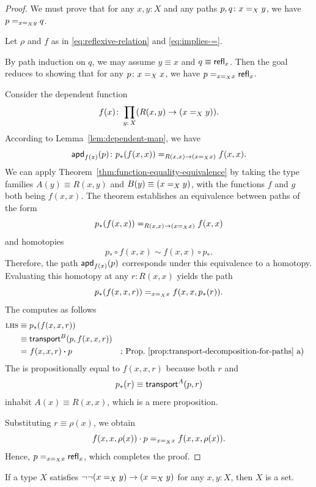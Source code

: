 \begin{proof}
    We must prove that for any $x,y\colon X$ and any paths $p,q\colon x\eq Xy$, we have $p\mathrel{=_{x\mathrel{=_{X}}y}}q$.

    Let $\rho$ and $f$ as in \eqref{eq:reflexive-relation} and \eqref{eq:implies-=}. 
    
    By path induction on $q$, we may assume $y\equiv x$ and $q\equiv\mathsf{refl}_x$. Then the goal reduces to showing that for any $p\colon x\eq Xx$, we have $p\mathrel{=_{x\mathrel{=_{X}}x}}\mathsf{refl}_x$.

    Consider the dependent function
    \[
        f(x)\colon\prod_{y\colon X}(R(x,y)\to(x\eq{X}y)).
    \]
    According to Lemma~\ref{lem:dependent-map}, we have
    \[
        \fun{apd}_{f(x)}(p)\colon
        p_*(f(x,x))\eq{R(x,x)\to(x\eq{X}x)}f(x,x).
    \]
    We can apply Theorem~\ref{thm:function-equality-equivalence} by taking the type families $A(y)\equiv R(x,y)$ and $B(y)\equiv (x\mathrel{=_{X}}y)$, with the functions $f$ and $g$ both being $f(x,x)$. The theorem establishes an equivalence between paths of the form 
    \[
        p_*(f(x,x))\mathrel{=_{R(x,x)\to(x\mathrel{=_{X}}x)}}f(x,x)
    \]
    and homotopies
    \[
        p_*\circ f(x,x)\sim f(x,x)\circ p_*.
    \]
    Therefore, the path $\mathsf{apd}_{f(x)}(p)$ corresponds under this equivalence to a homotopy. Evaluating this homotopy at any $r\colon R(x,x)$ yields the path
    \[
        p_*(f(x,x,r))\mathrel{=_{x\mathrel{=_{X}}x}}f(x,x,p_*(r)).
    \]
    The \lhs computes as follows
    \begin{align*}
        \textsc{lhs}&\equiv p_*(f(x,x,r))\\
            &\equiv\mathsf{transport}^B(p,f(x,x,r))\\
            &\mathrel{=_{}}f(x,x,r)\mathbin{\boldsymbol{\cdot}} p
                &&\text{; Prop.~\ref{prop:transport-decomposition-for-paths} a)}
    \end{align*}
    The \rhs is propositionally equal to $f(x,x,r)$ because both $r$ and
    \[
        p_*(r)\equiv\mathsf{transport}^A(p,r)
    \]
    inhabit $A(x)\equiv R(x,x)$, which is a mere proposition.

    Substituting $r \equiv \rho(x)$, we obtain
    \[
        f(x,x,\rho(x))\cdot p\mathrel{=_{x\mathrel{=_{X}}x}}f(x,x,\rho(x)).
    \]
    Hence, $p\mathrel{=_{x\mathrel{=_{X}}x}}\mathsf{refl}_x$, which completes the proof.
    
\end{proof}

\begin{cor}\label{cor:double-neg-condition-for-set}
    If a type\/ $X$ satisfies\/ $\neg\neg(x\mathrel{=_{X}}y)\to(x\mathrel{=_{X}}y)$ for any\/ $x, y\colon X$, then\/ $X$ is a set.
\end{cor}

